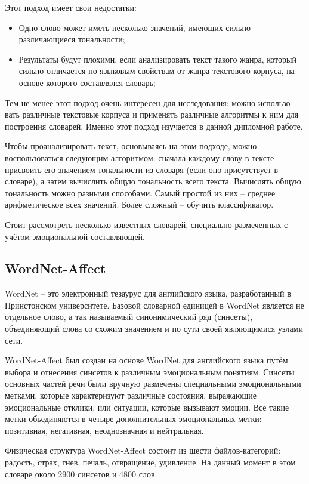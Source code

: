 Этот подход имеет свои недостатки:

\begin{itemize}
\item Одно слово может иметь несколько значений, имеющих сильно различающиеся
тональности; 
\item Результаты будут плохими, если анализировать текст такого жанра, который
сильно отличается по языковым свойствам от жанра текстового корпуса, на
основе которого составлялся словарь;
\end{itemize}

Тем не менее этот подход очень интересен для исследования: можно использо-
вать различные текстовые корпуса и применять различные алгоритмы к ним для
построения словарей. Именно этот подход изучается в данной дипломной работе.

Чтобы проанализировать текст, основываясь на этом подходе, можно воспользоваться
следующим алгоритмом: сначала каждому слову в тексте присвоить его
значением тональности из словаря (если оно присутствует в словаре), а затем
вычислить общую тональность всего текста. Вычислять общую тональность можно
разными способами. Самый простой из них -- среднее арифметическое всех значений.
Более сложный -- обучить классификатор.

Стоит рассмотреть несколько известных словарей, специально размеченных с
учётом эмоциональной составляющей.

\subsection{WordNet-Affect}
WordNet -- это электронный тезаурус для английского языка, разработанный в
Принстонском университете. Базовой словарной единицей в WordNet является не
отдельное слово, а так называемый синонимический ряд (синсеты), объединяющий
слова со схожим значением и по сути своей являющимися узлами сети.

WordNet-Affect был создан на основе WordNet для английского языка путём выбора и
отнесения синсетов к различным эмоциональным понятиям. Синсеты основных
частей речи были вручную размечены специальными эмоциональными метками, которые
характеризуют различные состояния, выражающие эмоциональные
отклики, или ситуации, которые вызывают эмоции. Все такие метки обьединяются
в четыре дополнительных эмоциональных метки: позитивная, негативная,
неоднозначная и нейтральная.

Физическая структура WordNet-Affect состоит из шести файлов-категорий: радость,
страх, гнев, печаль, отвращение, удивление. На данный момент в этом словаре
около 2900 синсетов и 4800 слов.

